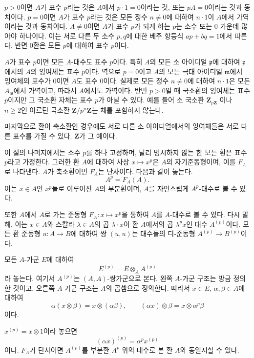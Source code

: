 \begin{env}[21.1.2]
\label{0.21.1.2-ko}
$p>0$이면 $A$가 표수 $p$라는 것은 $A$에서 $p\cdot1=0$이라는 것,
또는 $pA=0$이라는 것과 동치이다. $p=0$이면 $A$가 표수 $p$라는 것은
모든 정수 $n\neq0$에 대하여 $n\cdot1$이 $A$에서 가역이라는 것과
동치이다. $A\neq0$이면 $A$가 표수 $p$가 되게 하는 $p$는 소수 또는
$0$ 가운데 많아야 하나이다. 이는 서로 다른 두 소수 $p,q$에 대한
베주 항등식 $ap+bq=1$에서 따른다. 반면 $0$환은 모든 $p$에 대하여
표수 $p$이다.
\end{env}

\begin{env}[21.1.3]
\label{0.21.1.3-ko}
$A$가 표수 $p$이면 모든 $A$-대수도 표수 $p$이다. 특히 $A$의 모든
소 아이디얼 $\mathfrak p$에 대하여 $\mathfrak p$에서의 $A$의 잉여체는
표수 $p$이다. 역으로 $p=0$이고 $A$의 모든 극대 아이디얼
$\mathfrak m$에서 잉여체의 표수가 $0$이면 $A$도 표수 $0$이다.
실제로 모든 정수 $n\neq0$에 대하여 $n\cdot1$은 모든
$A_{\mathfrak m}$에서 가역이고, 따라서 $A$에서도 가역이다. 반면
$p>0$일 때 국소환의 잉여체는 표수 $p$이지만 그 국소환 자체는 표수
$p$가 아닐 수 있다. 예를 들어 소 국소환
$\mathbf Z_{p\mathbf Z}$ 이나 $n\geq2$인 아르틴
국소환 $\mathbf Z/p^n\mathbf Z$는 체를 포함하지 않는다.

마지막으로 환이 축소환인 경우에도 서로 다른 소 아이디얼에서의
잉여체들은 서로 다른 표수를 가질 수 있다. $\mathbf Z$가 그 예이다.
\end{env}

\begin{env}[21.1.4]
\label{0.21.1.4-ko}
이 절의 나머지에서는 소수 $p$를 하나 고정하며, 달리 명시하지 않는 한
모든 환은 표수 $p$라고 가정한다. 그러한 환 $A$에 대하여 사상
$x\mapsto x^p$은 $A$의 자기준동형이며, 이를 $F_A$로 나타낸다.
$A$가 축소환이면 $F_A$는 단사이다. 다음과 같이 놓는다.
\[
  A^p=F_A(A).
\]
이는 $x\in A$인 $x^p$들로 이루어진 $A$의 부분환이며, $A$를 자연스럽게
$A^p$-대수로 볼 수 있다.

또한 $A$에서 $A$로 가는 준동형 $F_A:x\mapsto x^p$을 통하여 $A$를
$A$-대수로 볼 수 있다. 다시 말해, 이는 $x\in A$와 스칼라
$\lambda\in A$의 곱 $\lambda\cdot x$이 환 $A$에서의 곱
$\lambda^p x$인 대수 $A^{(p)}$이다. 모든 환 준동형 $u:A\to B$에
대하여 쌍 $(u,u)$는 대수들의 디-준동형
$A^{(p)}\to B^{(p)}$이다.

모든 $A$-가군 $E$에 대하여
\[
  E^{(p)}=E\otimes_A A^{(p)}
\]
라 놓는다. 여기서 $A^{(p)}$는 $(A,A)$-쌍가군으로 본다. 왼쪽
$A$-가군 구조는 방금 정의한 것이고, 오른쪽 $A$-가군 구조는 $A$의
곱셈으로 정의한다. 따라서 $x\in E$, $\alpha,\beta\in A$에 대하여
\[
  \alpha(x\otimes\beta)=x\otimes(\alpha\beta),\qquad
  (\alpha x)\otimes\beta=x\otimes\alpha^p\beta
\]
이다.
\end{env}
$x^{(p)}=x\otimes1$이라 놓으면
\[
  (\alpha x)^{(p)}=\alpha^p x^{(p)}
\]
이다. $F_A$가 단사이면 $A^{(p)}$를 부분환 $A^p$ 위의 대수로 본 환
$A$와 동일시할 수 있다.

